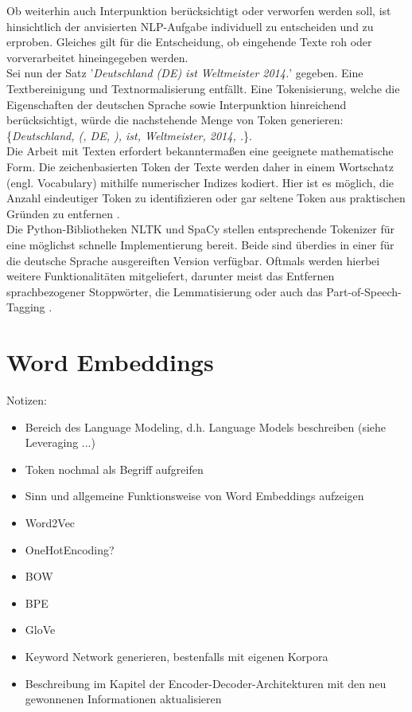 \noindent
Ob weiterhin auch Interpunktion berücksichtigt oder verworfen werden soll, ist hinsichtlich der anvisierten \ac{NLP}-Aufgabe individuell zu entscheiden und zu erproben. Gleiches gilt für die Entscheidung, ob eingehende Texte roh oder vorverarbeitet hineingegeben werden.\\

\noindent
Sei nun der Satz '\textit{Deutschland (DE) ist Weltmeister 2014.}' gegeben. Eine Textbereinigung und Textnormalisierung entfällt. Eine Tokenisierung, welche die Eigenschaften der deutschen Sprache sowie Interpunktion hinreichend berücksichtigt, würde die nachstehende Menge von Token generieren: \{\textit{Deutschland, (, DE, ), ist, Weltmeister, 2014, .}\}.\\

\noindent
Die Arbeit mit Texten erfordert bekanntermaßen eine geeignete mathematische Form. Die zeichenbasierten Token der Texte werden daher in einem Wortschatz (engl. Vocabulary) mithilfe numerischer Indizes kodiert. Hier ist es möglich, die Anzahl eindeutiger Token zu identifizieren oder gar seltene Token aus praktischen Gründen zu entfernen \cite[S.~311-312]{ZHA20}.\\

\noindent
Die Python-Bibliotheken \ac{NLTK} und SpaCy stellen entsprechende Tokenizer für eine möglichst schnelle Implementierung bereit. Beide sind überdies in einer für die deutsche Sprache ausgereiften Version verfügbar. Oftmals werden hierbei weitere Funktionalitäten mitgeliefert, darunter meist das Entfernen sprachbezogener Stoppwörter, die Lemmatisierung oder auch das Part-of-Speech-Tagging \cite[S.~111]{BIR09}.


\section{Word Embeddings}
Notizen:
\begin{itemize}
	\item Bereich des Language Modeling, d.h. Language Models beschreiben (siehe Leveraging ...)
	\item Token nochmal als Begriff aufgreifen
	\item Sinn und allgemeine Funktionsweise von Word Embeddings aufzeigen
	\item Word2Vec
	\item OneHotEncoding?
	\item BOW
	\item BPE
	\item GloVe
	\item Keyword Network generieren, bestenfalls mit eigenen Korpora
	\item Beschreibung im Kapitel der Encoder-Decoder-Architekturen mit den neu gewonnenen Informationen aktualisieren
\end{itemize}


